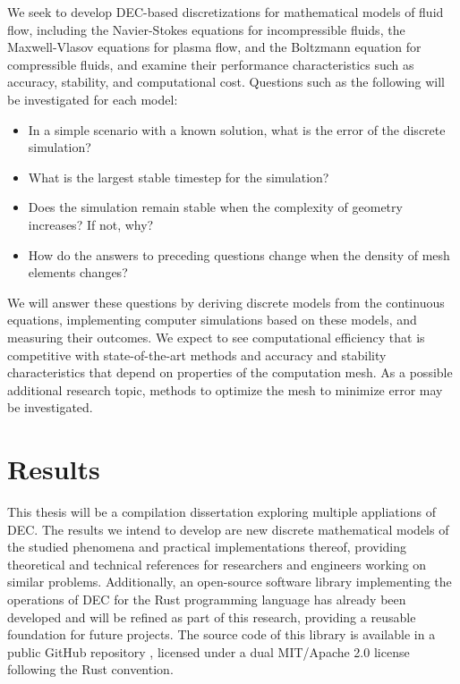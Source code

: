 \documentclass{article}
\begin{document}
We seek to develop DEC-based discretizations for mathematical models of fluid flow,
including the Navier-Stokes equations for incompressible fluids,
the Maxwell-Vlasov equations for plasma flow,
and the Boltzmann equation for compressible fluids,
and examine their performance characteristics such as accuracy,
stability, and computational cost.
Questions such as the following will be investigated for each model:
\begin{itemize}
  \item In a simple scenario with a known solution,
  what is the error of the discrete simulation?
  \item What is the largest stable timestep for the simulation?
  \item Does the simulation remain stable when the complexity of geometry increases?
  If not, why?
  \item How do the answers to preceding questions change
  when the density of mesh elements changes?
\end{itemize}

We will answer these questions by deriving discrete models from the continuous equations,
implementing computer simulations based on these models,
and measuring their outcomes.
We expect to see computational efficiency that is competitive with state-of-the-art methods
and accuracy and stability characteristics that depend on properties of the computation mesh.
As a possible additional research topic, methods to optimize the mesh
to minimize error may be investigated.

\section*{Results}

This thesis will be a compilation dissertation exploring multiple appliations of DEC.
The results we intend to develop are new discrete mathematical models of the studied phenomena
and practical implementations thereof,
providing theoretical and technical references
for researchers and engineers working on similar problems.
Additionally, an open-source software library implementing the operations of DEC
for the Rust programming language
has already been developed and will be refined as part of this research,
providing a reusable foundation for future projects.
The source code of this library is available
in a public GitHub repository \parencite{myyra_m0lentumdexterior_2024},
licensed under a dual MIT/Apache 2.0 license following the Rust convention.
\end{document}
